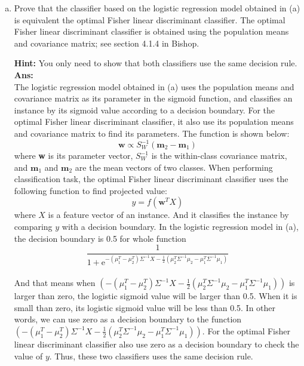 \documentclass[11pt]{article}
\begin{document}
\begin{enumerate}[(a)]
\item Prove that the classifier based on the logistic regression model obtained in (a) is equivalent the optimal Fisher linear discriminant classifier.  The optimal Fisher linear discriminant classifier is obtained using the population means and covariance matrix; see section 4.1.4 in Bishop.

{\bf Hint:} You only need to show that both classifiers use the same decision rule.\\
\textbf{Ans:}\\
The logistic regression model obtained in (a) uses the population means and covariance matrix as its parameter in the sigmoid function, and classifies an instance by its sigmoid value according to a decision boundary. For the optimal Fisher linear discriminant classifier, it also use its population means and covariance matrix to find its parameters. The function is shown below:\\
$$\textbf{w} \propto S_W^{-1}(\textbf{m}_2 - \textbf{m}_1)$$
%
where \textbf{w} is its parameter vector, $S_W^{-1}$ is the within-class covariance matrix, and $\textbf{m}_1$ and $\textbf{m}_2$ are the mean vectors of two classes.  When performing classification task, the optimal Fisher linear discriminant classifier uses the following function to find projected value:
$$y = f(\textbf{w}^TX)$$
where $X$ is a feature vector of an instance. And it classifies the instance by comparing $y$ with a decision boundary. In the logistic regression model in (a), the decision boundary is 0.5 for whole function
 $$\frac{1}{1+\mathrm{e}^{ 
 -(\mu_1^T-\mu_2^T)\Sigma^{-1}X
 - \frac{1}{2}( \mu_2^T\Sigma^{-1}\mu_2
- \mu_1^T\Sigma^{-1}\mu_1)
 }}$$\\
And that means when $ 
 (-(\mu_1^T-\mu_2^T)\Sigma^{-1}X
 - \frac{1}{2}( \mu_2^T\Sigma^{-1}\mu_2
- \mu_1^T\Sigma^{-1}\mu_1))
 $ is larger than zero, the logistic sigmoid value will be larger than 0.5. When it is small than zero, its logistic sigmoid value will be less than 0.5. In other words, we can use zero as a decision boundary to the function $ 
 (-(\mu_1^T-\mu_2^T)\Sigma^{-1}X
 - \frac{1}{2}( \mu_2^T\Sigma^{-1}\mu_2
- \mu_1^T\Sigma^{-1}\mu_1))
 $. 
 For the optimal Fisher linear discriminant classifier also use zero as a decision boundary to check the value of $y$. Thus, these two classifiers uses the same decision rule.
\end{enumerate}

\end{document}
